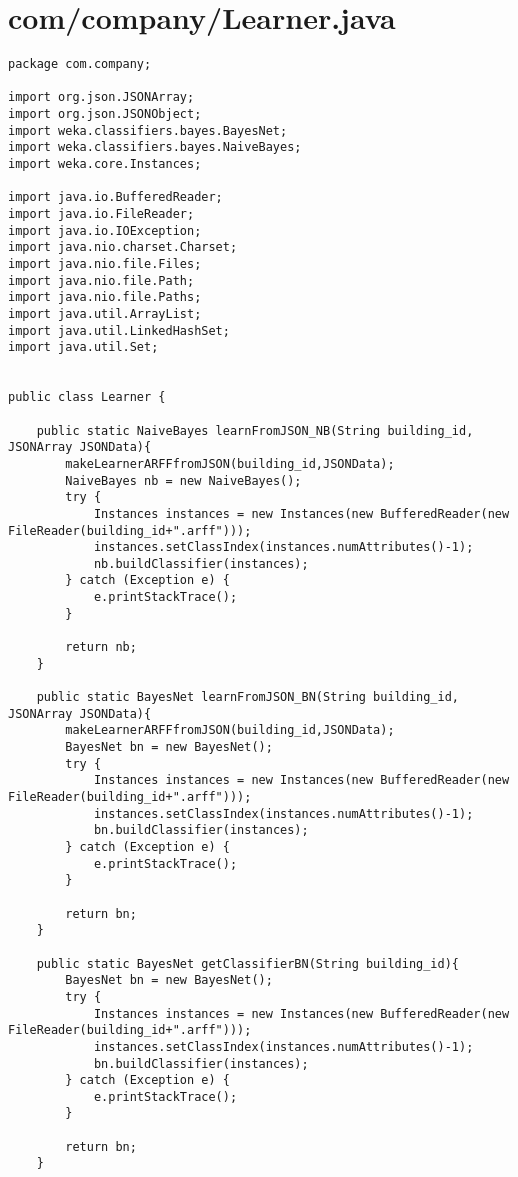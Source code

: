 \documentclass{article}
\begin{document}
\section{com/company/Learner.java}
\begin{lstlisting}package com.company;

import org.json.JSONArray;
import org.json.JSONObject;
import weka.classifiers.bayes.BayesNet;
import weka.classifiers.bayes.NaiveBayes;
import weka.core.Instances;

import java.io.BufferedReader;
import java.io.FileReader;
import java.io.IOException;
import java.nio.charset.Charset;
import java.nio.file.Files;
import java.nio.file.Path;
import java.nio.file.Paths;
import java.util.ArrayList;
import java.util.LinkedHashSet;
import java.util.Set;


public class Learner {

    public static NaiveBayes learnFromJSON_NB(String building_id, JSONArray JSONData){
        makeLearnerARFFfromJSON(building_id,JSONData);
        NaiveBayes nb = new NaiveBayes();
        try {
            Instances instances = new Instances(new BufferedReader(new FileReader(building_id+".arff")));
            instances.setClassIndex(instances.numAttributes()-1);
            nb.buildClassifier(instances);
        } catch (Exception e) {
            e.printStackTrace();
        }

        return nb;
    }

    public static BayesNet learnFromJSON_BN(String building_id, JSONArray JSONData){
        makeLearnerARFFfromJSON(building_id,JSONData);
        BayesNet bn = new BayesNet();
        try {
            Instances instances = new Instances(new BufferedReader(new FileReader(building_id+".arff")));
            instances.setClassIndex(instances.numAttributes()-1);
            bn.buildClassifier(instances);
        } catch (Exception e) {
            e.printStackTrace();
        }

        return bn;
    }

    public static BayesNet getClassifierBN(String building_id){
        BayesNet bn = new BayesNet();
        try {
            Instances instances = new Instances(new BufferedReader(new FileReader(building_id+".arff")));
            instances.setClassIndex(instances.numAttributes()-1);
            bn.buildClassifier(instances);
        } catch (Exception e) {
            e.printStackTrace();
        }

        return bn;
    }


\end{lstlisting}
\end{document}
